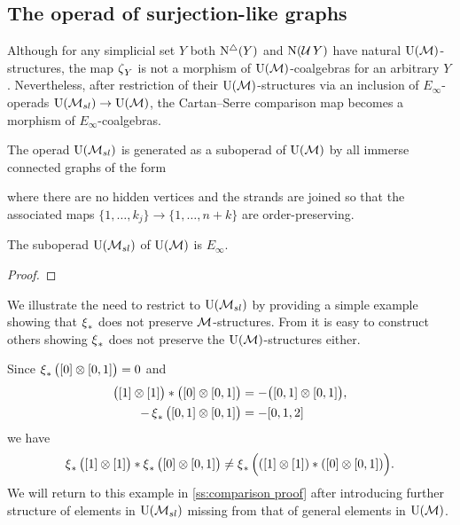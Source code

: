 \subsection{The operad of surjection-like graphs} \label{ss:surjection-like graphs}

Although for any simplicial set $Y$ both $\operatorname{N^{\triangle}}(Y)$ and $\operatorname{N}(\operatorname{\mathcal{U}} Y)$ have natural ${\operatorname{U}(\mathcal{M})}$-structures, the map $\operatorname{\zeta}_Y$ is not a morphism of ${\operatorname{U}(\mathcal{M})}$-coalgebras for an arbitrary $Y$.
Nevertheless, after restriction of their ${\operatorname{U}(\mathcal{M})}$-structures via an inclusion of $E_\infty$-operads ${\operatorname{U}(\mathcal{M}_{sl})} \to {\operatorname{U}(\mathcal{M})}$, the Cartan--Serre comparison map becomes a morphism of $E_\infty$-coalgebras.

The operad ${\operatorname{U}(\mathcal{M}_{sl})}$ is generated as a suboperad of ${\operatorname{U}(\mathcal{M})}$ by all immerse connected graphs of the form

where there are no hidden vertices and the strands are joined so that the associated maps $\{1, \dots, k_j\} \to \{1, \dots, n+k\}$ are order-preserving.

\begin{proposition} \label{p:simplicialandcubical}
	The suboperad ${\operatorname{U}(\mathcal{M}_{sl})}$ of ${\operatorname{U}(\mathcal{M})}$ is $E_\infty$.
\end{proposition}

\begin{proof}
\end{proof}

\begin{example}
	We illustrate the need to restrict to ${\operatorname{U}(\mathcal{M}_{sl})}$ by providing a simple example showing that $\operatorname{\xi}_\ast$ does not preserve $\mathcal{M}$-structures.
	From it is easy to construct others showing $\operatorname{\xi}_\ast$ does not preserve the ${\operatorname{U}(\mathcal{M})}$-structures either.

	Since $\operatorname{\xi}_\ast \big( [0] \otimes [0,1] \big) = 0$ and
	\begin{align*}
	\big( [1] \otimes [1] \big) \ast \big( [0] \otimes [0,1] \big) &=
	- \big( [0,1] \otimes [0,1] \big), \\
	- \operatorname{\xi}_\ast \big( [0,1] \otimes [0,1] \big) & = - [0,1,2]
	\end{align*}
	we have
	\[
	\operatorname{\xi}_\ast \big( [1] \otimes [1] \big) \ast \operatorname{\xi}_\ast \big( [0] \otimes [0,1] \big) \neq \operatorname{\xi}_\ast \Big( ([1] \otimes [1]) \ast ([0] \otimes [0,1]) \Big).
	\]
	We will return to this example in \cref{ss:comparison proof} after introducing further structure of elements in ${\operatorname{U}(\mathcal{M}_{sl})}$ missing from that of general elements in ${\operatorname{U}(\mathcal{M})}$.
\end{example}

